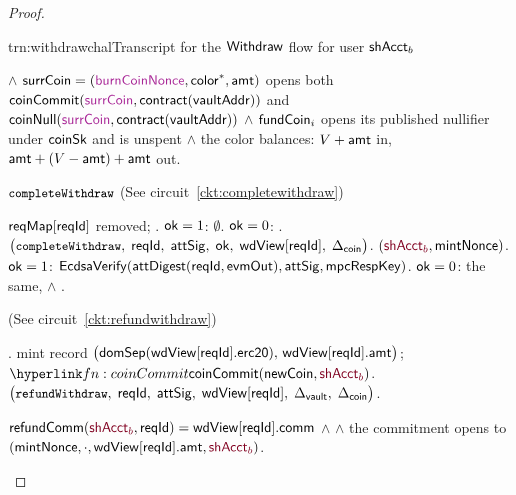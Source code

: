 \begin{proof}
\begin{itemize} [label=$\blacksquare$]
\begin{CktBox}{trn:withdrawchal}{Transcript for the $\mathsf{Withdraw}$ flow for user $\mathsf{shAcct}_b$}
\begin{OutList}
{ \oitem{\Rel}  \;$\wedge$\;
   $\coinIn = (\freshrn{\burnNonce}, \mathsf{color}^{*}, \amt)$ opens both
   $\coinCommit(\freshrn{\coinIn}, \mathsf{contract}(\vaultAddr))$ and
   $\coinNull(\freshrn{\coinIn}, \mathsf{contract}(\vaultAddr))$ \;$\wedge$\;
    $\mathsf{fundCoin}_i$ opens its published nullifier under $\mathsf{coinSk}$ and is unspent \;$\wedge$\;
  the color balances: $V + \mathsf{amt}$ in, $\mathsf{amt} + (V-\mathsf{amt}) + \mathsf{amt}$ out.
  }
\end{OutList}
\vspace{5pt}
$\texttt{\small completeWithdraw}$ (See circuit~\ref{ckt:completewithdraw})
\begin{OutList}
\oitem{\Dvault} $\mathsf{reqMap}[\mathsf{reqId}]$ removed; .
\oitem{\Dshd} $\mathsf{ok} = 1$: $\emptyset$.   $\mathsf{ok} = 0$: .
\oitem{\stmt} $\bigl(\texttt{\small completeWithdraw},\; \mathsf{reqId},\; \mathsf{attSig},\; \mathsf{ok},\;
  \mathsf{wdView}[\mathsf{reqId}],\; \Delta_{\mathsf{coin}}\bigr)$.
$(\secret{\candB}, \mintNonce)$.
\oitem{\Rel} $\mathsf{ok} = 1$: $\mathsf{EcdsaVerify}(\mathsf{attDigest}(\mathsf{reqId},\mathsf{evmOut}), \mathsf{attSig}, \mathsf{mpcRespKey})$. \quad
  $\mathsf{ok} = 0$: the same, $\wedge$ .

\end{OutList}

\vspace{10pt}

\upd{$\cktRefundWithdraw$} (See circuit~\ref{ckt:refundwithdraw})
\begin{OutList}
\oitem{\Dvault}  .
\oitem{\Dshd} \bluedot mint record $\bigl(\mathsf{domSep}(\mathsf{wdView}[\mathsf{reqId}].\mathsf{erc20}),\,
  \mathsf{wdView}[\mathsf{reqId}].\mathsf{amt}\bigr)$; \;
  \bluedot $\lnk{fn:coinCommit}{\coinCommit(\coinMint, \secret{\candB})}$.
\oitem{\stmt} $\bigl(\texttt{\small refundWithdraw},\; \mathsf{reqId},\; \mathsf{attSig},\; \mathsf{wdView}[\mathsf{reqId}],\;
  \Delta_{\mathsf{vault}},\; \Delta_{\mathsf{coin}}\bigr)$.

\oitem{\Rel} $\refundComm(\secret{\candB}, \rid) = \upd{\wdView[\rid].\fComm}$ \;$\wedge$\;
   \;$\wedge$\; the commitment opens to
  $(\mintNonce, \cdot, \upd{\wdView[\rid].\fAmt}, \secret{\candB})$.


\end{OutList}
\end{CktBox}
\end{itemize}
\end{proof}
